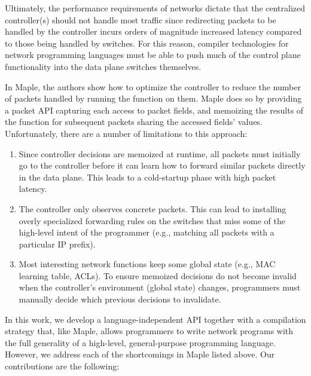 \documentclass[preprint]{sigplanconf}
\begin{document}
Ultimately, the performance requirements of networks dictate that the centralized controller(s) should not handle most traffic since redirecting packets to be handled by the controller incurs orders of magnitude increased latency compared to those being handled by switches. For this reason, compiler technologies for network programming languages must be able to push much of the control plane functionality into the data plane switches themselves. 

In Maple\cite{Maple}, the authors show how to optimize the controller to reduce the number of packets handled by running the function on them. Maple does so by providing a packet API capturing each access to packet fields, and memoizing the results of the function for subsequent packets sharing the accessed fields' values. Unfortunately, there are a number of limitations to this approach:


\begin{enumerate}
\item Since controller decisions are memoized at runtime, all packets must initially go to the controller before it can learn how to forward similar packets directly in the data plane. This leads to a cold-startup phase with high packet latency.
\item The controller only observes concrete packets. This can lead to installing overly specialized forwarding rules on the switches that miss some of the high-level intent of the programmer (e.g., matching all packets with a particular IP prefix).
\item Most interesting network functions keep some global state (e.g., MAC learning table, ACLs). To ensure memoized decisions do not become invalid when the controller's environment (global state) changes, programmers must manually decide which previous decisions to invalidate.
\end{enumerate}


In this work, we develop a language-independent API together with a compilation strategy that, like Maple, allows programmers to write network programs with the full generality of a high-level, general-purpose programming language.
However, we address each of the shortcomings in Maple listed above. Our contributions are the following:
\end{document}
